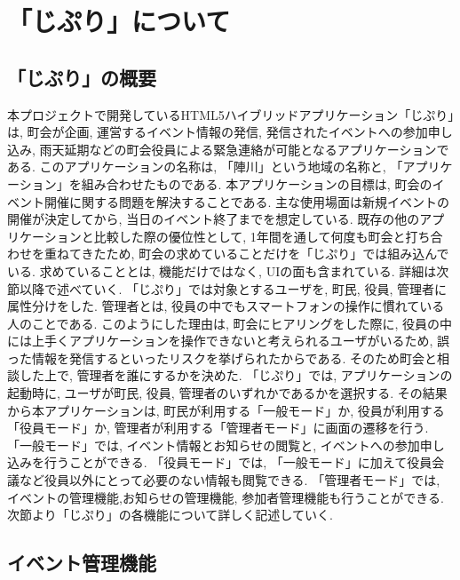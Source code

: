\chapter{「じぷり」について}

\section{「じぷり」の概要\label{sec:app_overview}}
本プロジェクトで開発しているHTML5ハイブリッドアプリケーション「じぷり」は, 町会が企画, 運営するイベント情報の発信, 発信されたイベントへの参加申し込み, 雨天延期などの町会役員による緊急連絡が可能となるアプリケーションである. このアプリケーションの名称は, 「陣川」という地域の名称と, 「アプリケーション」を組み合わせたものである. 本アプリケーションの目標は, 町会のイベント開催に関する問題を解決することである. 主な使用場面は新規イベントの開催が決定してから, 当日のイベント終了までを想定している. 既存の他のアプリケーションと比較した際の優位性として, 1年間を通して何度も町会と打ち合わせを重ねてきたため, 町会の求めていることだけを「じぷり」では組み込んでいる. 求めていることとは, 機能だけではなく, UIの面も含まれている. 詳細は次節以降で述べていく. 「じぷり」では対象とするユーザを, 町民, 役員, 管理者に属性分けをした. 管理者とは, 役員の中でもスマートフォンの操作に慣れている人のことである. このようにした理由は, 町会にヒアリングをした際に, 役員の中には上手くアプリケーションを操作できないと考えられるユーザがいるため, 誤った情報を発信するといったリスクを挙げられたからである. そのため町会と相談した上で, 管理者を誰にするかを決めた. 「じぷり」では, アプリケーションの起動時に, ユーザが町民, 役員, 管理者のいずれかであるかを選択する. その結果から本アプリケーションは, 町民が利用する「一般モード」か, 役員が利用する「役員モード」か, 管理者が利用する「管理者モード」に画面の遷移を行う. 「一般モード」では, イベント情報とお知らせの閲覧と, イベントへの参加申し込みを行うことができる. 「役員モード」では, 「一般モード」に加えて役員会議など役員以外にとって必要のない情報も閲覧できる. 「管理者モード」では, イベントの管理機能,お知らせの管理機能, 参加者管理機能も行うことができる. 次節より「じぷり」の各機能について詳しく記述していく.

\section{イベント管理機能}%
